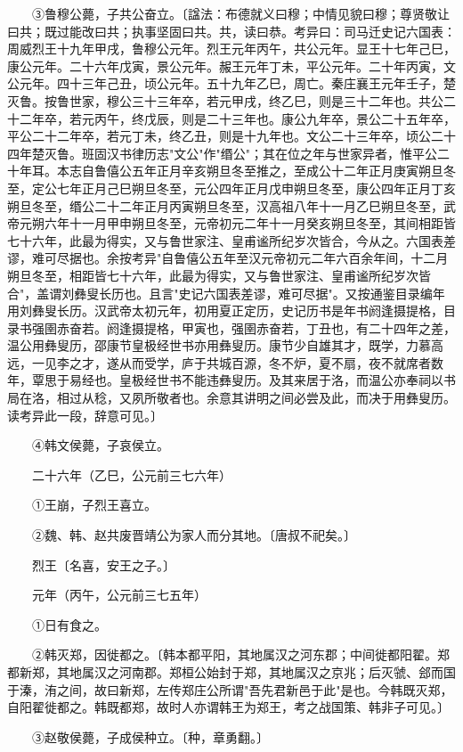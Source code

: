 　　③鲁穆公薨，子共公奋立。〔諡法：布德就义曰穆；中情见貌曰穆；尊贤敬让曰共；既过能改曰共；执事坚固曰共。共，读曰恭。考异曰：司马迁史记六国表：周威烈王十九年甲戌，鲁穆公元年。烈王元年丙午，共公元年。显王十七年己巳，康公元年。二十六年戊寅，景公元年。赧王元年丁未，平公元年。二十年丙寅，文公元年。四十三年己丑，顷公元年。五十九年乙巳，周亡。秦庄襄王元年壬子，楚灭鲁。按鲁世家，穆公三十三年卒，若元甲戌，终乙巳，则是三十二年也。共公二十二年卒，若元丙午，终戊辰，则是二十三年也。康公九年卒，景公二十五年卒，平公二十二年卒，若元丁未，终乙丑，则是十九年也。文公二十三年卒，顷公二十四年楚灭鲁。班固汉书律历志"文公"作"缗公"；其在位之年与世家异者，惟平公二十年耳。本志自鲁僖公五年正月辛亥朔旦冬至推之，至成公十二年正月庚寅朔旦冬至，定公七年正月己巳朔旦冬至，元公四年正月戊申朔旦冬至，康公四年正月丁亥朔旦冬至，缗公二十二年正月丙寅朔旦冬至，汉高祖八年十一月乙巳朔旦冬至，武帝元朔六年十一月甲申朔旦冬至，元帝初元二年十一月癸亥朔旦冬至，其间相距皆七十六年，此最为得实，又与鲁世家注、皇甫谧所纪岁次皆合，今从之。六国表差谬，难可尽据也。余按考异"自鲁僖公五年至汉元帝初元二年六百余年间，十二月朔旦冬至，相距皆七十六年，此最为得实，又与鲁世家注、皇甫谧所纪岁次皆合"，盖谓刘彝叟长历也。且言"史记六国表差谬，难可尽据"。又按通鉴目录编年用刘彝叟长历。汉武帝太初元年，初用夏正定历，史记历书是年书阏逢摄提格，目录书强圉赤奋若。阏逢摄提格，甲寅也，强圉赤奋若，丁丑也，有二十四年之差，温公用彝叟历，邵康节皇极经世书亦用彝叟历。康节少自雄其才，既学，力慕高远，一见李之才，遂从而受学，庐于共城百源，冬不炉，夏不扇，夜不就席者数年，覃思于易经也。皇极经世书不能违彝叟历。及其来居于洛，而温公亦奉祠以书局在洛，相过从稔，又夙所敬者也。余意其讲明之间必尝及此，而决于用彝叟历。读考异此一段，辞意可见。〕

　　④韩文侯薨，子哀侯立。

　　二十六年（乙巳，公元前三七六年）

　　①王崩，子烈王喜立。

　　②魏、韩、赵共废晋靖公为家人而分其地。〔唐叔不祀矣。〕

　　烈王〔名喜，安王之子。〕

　　元年（丙午，公元前三七五年）

　　①日有食之。

　　②韩灭郑，因徙都之。〔韩本都平阳，其地属汉之河东郡；中间徙都阳翟。郑都新郑，其地属汉之河南郡。郑桓公始封于郑，其地属汉之京兆；后灭虢、郐而国于溱，洧之间，故曰新郑，左传郑庄公所谓"吾先君新邑于此"是也。今韩既灭郑，自阳翟徙都之。韩既都郑，故时人亦谓韩王为郑王，考之战国策、韩非子可见。〕

　　③赵敬侯薨，子成侯种立。〔种，章勇翻。〕

